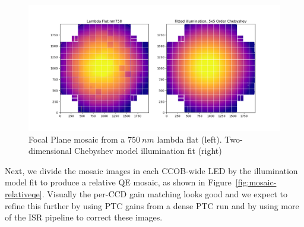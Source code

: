 \begin{figure}[ht]
    \centering
    \includegraphics[width=0.95\linewidth]{figures/lambda_nm750_withfit.png}
    \caption{Focal Plane mosaic from a $750~nm$ lambda flat (left). Two-dimensional Chebyshev model illumination fit (right)}
    \label{fig:mosaic-modelfit}
\end{figure}

Next, we divide the mosaic images in each CCOB-wide LED by the illumination model fit to produce a relative QE mosaic, as shown in Figure~\ref{fig:mosaic-relativeqe}.  Visually the per-CCD gain matching looks good and we expect to refine this further by using PTC gains from a dense PTC run and by using more of the ISR pipeline to correct these images. 

